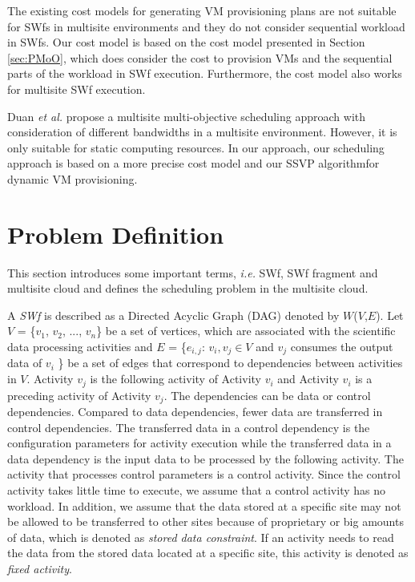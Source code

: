 The existing cost models for generating VM provisioning plans \cite{Coutinho2014} are not suitable for SWfs in multisite environments \cite{Oliveira2012,Sardina2010} and they do not consider sequential workload in SWfs.
Our cost model is based on the cost model presented in Section \ref{sec:PMoO}, which does consider the cost to provision VMs and the sequential parts of the workload in SWf execution. Furthermore, the cost model also works for multisite SWf execution. 

Duan \textit{et al.} \cite{Duan2014} propose a multisite multi-objective scheduling approach with consideration of different bandwidths in a multisite environment. However, it is only suitable for static computing resources. 
In our approach, our scheduling approach is based on a more precise cost model and our SSVP algorithmfor dynamic VM provisioning.


\section{Problem Definition}
\label{sec:PD}

This section introduces some important terms, \textit{i.e.} SWf, SWf fragment and multisite cloud and defines the scheduling problem in the multisite cloud.

A \textit{SWf} is described as a Directed Acyclic Graph (DAG) denoted by $W$($V$,$E$). Let $V$ = \{$v_1$, $v_2$, ..., $v_n$\} be a set of vertices, which are associated with the scientific data processing activities and $E$ = \{$e_{i,j}$: $v_i, v_j \in V$ and $v_j$ consumes the output data of $v_i$ \} be a set of edges that correspond to dependencies between activities in $V$. Activity $v_{j}$ is the following activity of Activity $v_{i}$ and Activity $v_{i}$ is a preceding activity of Activity $v_{j}$. The dependencies can be data or control dependencies. Compared to data dependencies, fewer data are transferred in control dependencies. The transferred data in a control dependency is the configuration parameters for activity execution while the transferred data in a data dependency is the input data to be processed by the following activity. The activity that processes control parameters is a control activity. Since the control activity takes little time to execute, we assume that a control activity has no workload. In addition, we assume that the data stored at a specific site may not be allowed to be transferred to other sites because of proprietary or big amounts of data, which is denoted as \textit{stored data constraint}. If an activity needs to read the data from the stored data located at a specific site, this activity is denoted as \textit{fixed activity}. 

